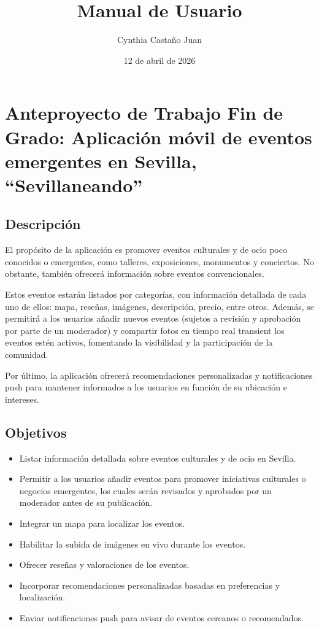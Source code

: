 \documentclass[12pt]{article}
\title{Manual de Usuario}
\author{Cynthia Castaño Juan}
\date{12 de abril de 2026}
\begin{document}
\maketitle
\tableofcontents
\newpage

\section{Anteproyecto de Trabajo Fin de Grado: Aplicación móvil de eventos emergentes en Sevilla, ``Sevillaneando''}

\subsection{Descripción}
El propósito de la aplicación es promover eventos culturales y de ocio poco conocidos o emergentes, como talleres, exposiciones, monumentos y conciertos. No obstante, también ofrecerá información sobre eventos convencionales.

Estos eventos estarán listados por categorías, con información detallada de cada uno de ellos: mapa, reseñas, imágenes, descripción, precio, entre otros. Además, se permitirá a los usuarios añadir nuevos eventos (sujetos a revisión y aprobación por parte de un moderador) y compartir fotos en tiempo real transient los eventos estén activos, fomentando la visibilidad y la participación de la comunidad.

Por último, la aplicación ofrecerá recomendaciones personalizadas y notificaciones push para mantener informados a los usuarios en función de su ubicación e intereses.

\subsection{Objetivos}
\begin{itemize}
    \item Listar información detallada sobre eventos culturales y de ocio en Sevilla.
    \item Permitir a los usuarios añadir eventos para promover iniciativas culturales o negocios emergentes, los cuales serán revisados y aprobados por un moderador antes de su publicación.
    \item Integrar un mapa para localizar los eventos.
    \item Habilitar la subida de imágenes en vivo durante los eventos.
    \item Ofrecer reseñas y valoraciones de los eventos.
    \item Incorporar recomendaciones personalizadas basadas en preferencias y localización.
    \item Enviar notificaciones push para avisar de eventos cercanos o recomendados.
\end{itemize}
\end{document}
